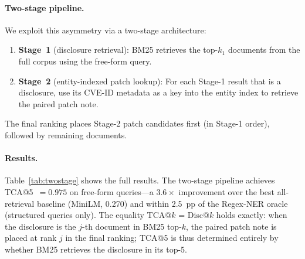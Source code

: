 \documentclass[11pt]{article}
\begin{document}
\paragraph{Two-stage pipeline.} We exploit this asymmetry via a two-stage architecture:
\begin{enumerate}[noitemsep]
  \item \textbf{Stage~1} (disclosure retrieval): BM25 retrieves the top-$k_1$ documents from the full corpus using the free-form query.
  \item \textbf{Stage~2} (entity-indexed patch lookup): For each Stage-1 result that is a disclosure, use its CVE-ID metadata as a key into the entity index to retrieve the paired patch note.
\end{enumerate}
The final ranking places Stage-2 patch candidates first (in Stage-1 order), followed by remaining documents.

\begin{table}[h]
\centering
\small
{}
\caption{Free-form query results on 159 real GHSA pairs (2,318-document corpus). Disc@5 = fraction of free-form queries for which BM25 retrieves the correct CVE disclosure in top-5. TCA@$k$ of the two-stage pipeline equals exactly Stage-1 Disc@$k$, since the $j$-th retrieved disclosure's patch note is placed at rank $j$ in the final ranking. Artifact: \texttt{data/ghsa\_twostage\_results.json}.}
\label{tab:twostage}
\end{table}

\paragraph{Results.} Table~\ref{tab:twostage} shows the full results. The two-stage pipeline achieves TCA@5~$= \mathbf{0.975}$ on free-form queries---a $3.6\times$ improvement over the best all-retrieval baseline (MiniLM, 0.270) and within 2.5~pp of the Regex-NER oracle (structured queries only). The equality TCA@$k$ = Disc@$k$ holds exactly: when the disclosure is the $j$-th document in BM25 top-$k$, the paired patch note is placed at rank $j$ in the final ranking; TCA@5 is thus determined entirely by whether BM25 retrieves the disclosure in its top-5.
\end{document}
